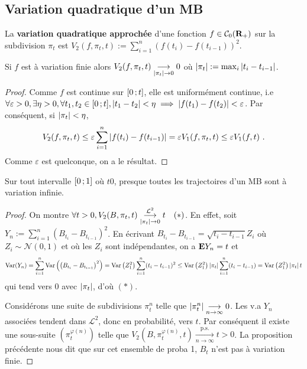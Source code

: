 \subsection{Variation quadratique d'un MB}

	\begin{defn}
		La \textbf{variation quadratique approchée} d'une fonction $f \in \mathcal{C}_0(\mathbf{R}_+)$ sur la subdivision $\pi_t$ est $V_2(f,\pi_t,t) := \sum_{i = 1}^n (f(t_i) - f(t_{i-1}))^2$.
	\end{defn}
	
	\begin{pop}
		Si $f$ est à variation finie alors $V_2(f,\pi_t,t) \underset{\left\lvert\pi_t\right\rvert \to 0}{\longrightarrow} 0$ où $\left\lvert\pi_t\right\rvert := \max_i \left\lvert t_i - t_{i-1}\right\rvert$.
	\end{pop}
	
	\begin{proof}
		Comme $f$ est continue sur $\mathopen{}\mathclose{\left[0\mathclose{}\mathpunct{};t\right]}$, elle est uniformément continue, i.e $\forall \varepsilon > 0, \exists \eta > 0, \forall t_1,t_2 \in \mathopen{}\mathclose{\left[0\mathclose{}\mathpunct{};t\right]}, \left\lvert t_1 - t_2\right\rvert < \eta \implies \left\lvert f(t_1) - f(t_2)\right\rvert < \varepsilon$.
		Par conséquent, si $\left\lvert\pi_t\right\rvert < \eta$,
		$$V_2(f,\pi_t,t) \leq \varepsilon \sum_{i = 1}^n \left\lvert f(t_i) - f(t_{i-1})\right\rvert = \varepsilon V_1(f,\pi_t,t) \leq \varepsilon V_1(f,t)\ .$$
		Comme $\varepsilon$ est quelconque, on a le résultat.
	\end{proof}
	
	\begin{thm}
		Sur tout intervalle $\mathopen{}\mathclose{\left[0\mathclose{}\mathpunct{};1\right]}$ où $t  0$, presque toutes les trajectoires d'un MB sont à variation infinie.
	\end{thm}
	
	\begin{proof}
		On montre $\forall t > 0, V_2(B,\pi_t,t) \underset{\left\lvert\pi_t\right\rvert \to 0}{\overset{\mathcal{L}^2}{\longrightarrow}} t\quad  (*)$.
		En effet, soit $Y_n := \sum_{i = 1}^n \left( B_{t_i} - B_{t_{i-1}} \right)^2$.
		En écrivant $B_{t_i} - B_{t_{i-1}} = \sqrt{t_i - t_{i-1}} Z_i$ où $Z_i \sim \mathcal{N}(0,1)$ et où les $Z_i$ sont indépendantes, on a $\mathbf{E} Y_n = t$ et
		$$\operatorname{Var}(Y_n) = \sum_{i = 1}^n \operatorname{Var} \left( \left( B_{t_i} - B_{t_{i-1}} \right)^2 \right)
			= \operatorname{Var} \left( Z_1^2 \right) \sum_{i = 1}^n (t_i - t_{i - 1})^2
			\leq \operatorname{Var} \left( Z_1^2 \right) \left\lvert\pi_t\right\rvert \sum_{i = 1}^n (t_i - t_{i - 1})
			= \operatorname{Var} \left( Z_1^2 \right) \left\lvert\pi_t\right\rvert t$$
		qui tend vers $0$ avec $\left\lvert\pi_t\right\rvert$, d'où $(*)$.
		
		Considérons une suite de subdivisions $\pi_t^n$ telle que $\left\lvert\pi_t^n\right\rvert \underset{n \to \infty}{\longrightarrow} 0$.
		Les v.a $Y_n$ associées tendent dans $\mathcal{L}^2$, donc en probabilité, vers $t$.
		Par conséquent il existe une sous-suite $\left( \pi_t^{\varphi(n)} \right)$ telle que $V_2(B,\pi_t^{\varphi(n)},t) \underset{n \to \infty}{\overset{\text{p.s.}}{\longrightarrow}} t > 0$.
		La proposition précédente nous dit que sur cet ensemble de proba 1, $B_t$ n'est pas à variation finie.
	\end{proof}


